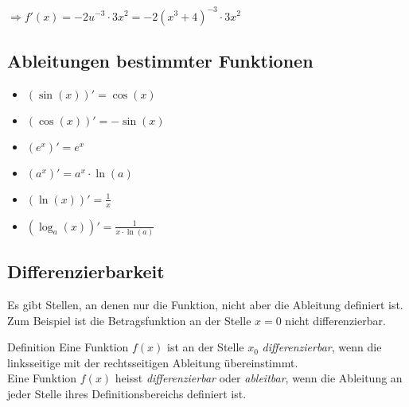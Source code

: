 $\Rightarrow f'(x) = -2u^{-3} \cdot 3x^2 = -2(x^3 + 4)^{-3} \cdot 3x^2$

\subsection{Ableitungen bestimmter Funktionen}\label{subsec:ableitungen-bestimmter-funktionen}

\begin{multicols}{2}
    \begin{itemize}
        \item $(\sin (x))' = \cos (x)$
        \item $(\cos (x))' = -\sin (x)$
        \item $(e^x)' = e^x$
        \item $(a^x)' = a^x \cdot \ln (a)$
        \item $(\ln (x))' = \frac{1}{x}$
        \item $(\log_a(x))' = \frac{1}{x \cdot \ln (a)}$
    \end{itemize}
\end{multicols}

\subsection{Differenzierbarkeit}\label{subsec:differenzierbarkeit}

Es gibt Stellen, an denen nur die Funktion, nicht aber die Ableitung definiert ist.
Zum Beispiel ist die Betragsfunktion an der Stelle $x = 0$ nicht differenzierbar.

\begin{definition}{Definition}
    Eine Funktion $f(x)$ ist an der Stelle $x_0$ \emph{differenzierbar}, wenn die linksseitige mit der rechtsseitigen Ableitung übereinstimmt.\\
    Eine Funktion $f(x)$ heisst \emph{differenzierbar} oder \emph{ableitbar}, wenn die Ableitung an jeder Stelle ihres Definitionsbereichs definiert ist.
\end{definition}